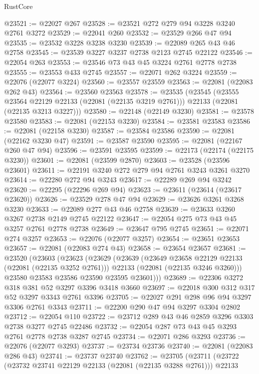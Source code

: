 \begin{lexlean}{RustCore}
\begin{coremodule}
@23521 := @22027 @267
@23528 := @23521 @272 @279 @94 @3228 @3240 @2761 @3272
@23529 := @22041 @260
@23532 := @23529 @266 @47 @94
@23535 := @23532 @3228 @3238 @3230
@23539 := @22089 @265 @43 @46 @2758
@23545 := @23539 @3227 @3237 @2738 @2123 @2745 @22122
@23546 := @22054 @263
@23553 := @23546 @73 @43 @45 @3224 @2761 @2778 @2738
@23555 := @23553 @433 @2745
@23557 := @22071 @262 @3224
@23559 := @22076 (@22077 @3224)
@23560 := @23557 @23559
@23563 := @22081 (@22083 @262 @43)
@23564 := @23560 @23563
@23578 := @23535
    (@23545
      (@23555 @23564 @22129 @22133 (@22081 (@22135 @3219 @2761)))
      @22133
      (@22081 (@22135 @3213 @3227)))
@23580 := @22148 (@22149 @3230)
@23581 := @23578 @23580
@23583 := @22081 (@22153 @3230)
@23584 := @23581 @23583
@23586 := @22081 (@22158 @3230)
@23587 := @23584 @23586
@23590 := @22081 (@22162 @3230 @47)
@23591 := @23587 @23590
@23595 := @22081 (@22167 @260 @47 @94)
@23596 := @23591 @23595
@23599 := @22173 (@22174 (@22175 @3230))
@23601 := @22081 (@23599 @2870)
@23603 := @23528 (@23596 @23601)
@23611 := @22191 @3240 @272 @279 @94 @2761 @3243 @3261 @3270
@23614 := @22280 @272 @94 @3243
@23617 := @22289 @269 @94 @3242
@23620 := @22295 (@22296 @269 @94)
@23623 := @23611 (@23614 (@23617 @23620))
@23626 := @23529 @278 @47 @94
@23629 := @23626 @3261 @3268 @3230
@23633 := @22089 @277 @43 @46 @2758
@23639 := @23633 @3260 @3267 @2738 @2149 @2745 @22122
@23647 := @22054 @275 @73 @43 @45 @3257 @2761 @2778 @2738
@23649 := @23647 @795 @2745
@23651 := @22071 @274 @3257
@23653 := @22076 (@22077 @3257)
@23654 := @23651 @23653
@23657 := @22081 (@22083 @274 @43)
@23658 := @23654 @23657
@23681 := @23520
    (@23603
      (@23623
        (@23629
          (@23639
            (@23649 @23658 @22129 @22133 (@22081 (@22135 @3252 @2761)))
            @22133
            (@22081 (@22135 @3246 @3260)))
          @23580
          @23583
          @23586
          @23590
          @23595
          @23601)))
@23689 := @22306 @3272 @318 @381 @52 @3297 @3396 @3418 @3660
@23697 := @22018 @300 @312 @317 @52 @3297 @3343 @2761 @3396
@23705 := @22027 @291 @298 @96 @94 @3297 @3306 @2761 @3343
@23711 := @22200 @290 @47 @94 @3297 @3304 @2802
@23712 := @22054 @110
@23722 := @23712 @289 @43 @46 @2859 @3296 @3303 @2738 @3277 @2745 @22486
@23732 := @22054 @287 @73 @43 @45 @3293 @2761 @2778 @2738 @3287 @2745
@23734 := @22071 @286 @3293
@23736 := @22076 (@22077 @3293)
@23737 := @23734 @23736
@23740 := @22081 (@22083 @286 @43)
@23741 := @23737 @23740
@23762 := @23705
    (@23711
      (@23722
        (@23732 @23741 @22129 @22133 (@22081 (@22135 @3288 @2761)))
        @22133

\end{coremodule}
\end{lexlean}
